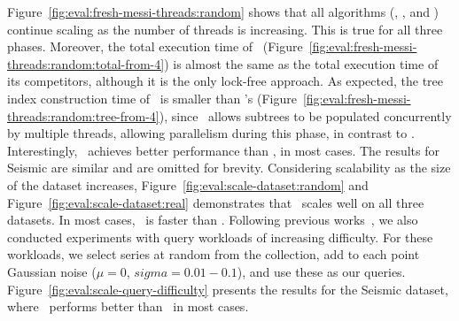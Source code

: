 Figure~\ref{fig:eval:fresh-messi-threads:random} shows that all algorithms
(\Fresh, \MESSI, and \MESSIenh) continue scaling as the number of threads is increasing.
This is true for all three phases. 
Moreover, the total execution time of \Fresh\ 
(Figure~\ref{fig:eval:fresh-messi-threads:random:total-from-4})
is almost the same as the total execution time of its competitors, although it
is the only lock-free approach. 
As expected, the tree index construction time of \Fresh\ is smaller than \MESSI's 
(Figure~\ref{fig:eval:fresh-messi-threads:random:tree-from-4}), since \Fresh\ allows
subtrees to be populated concurrently by multiple threads, allowing parallelism during
this phase, in contrast to \MESSI. 
Interestingly, \Fresh\ achieves better performance than \MESSIenh, in most cases.
The results for Seismic are similar and are omitted for brevity.
Considering scalability as the size of the dataset increases, 
Figure~\ref{fig:eval:scale-dataset:random} and Figure~\ref{fig:eval:scale-dataset:real} 
demonstrates that \Fresh\ scales well on all three datasets. 
In most cases, \Fresh\ is faster than \MESSI.
Following previous works~\cite{DBLP:journals/vldb/ZoumpatianosLIP18,PFP21-I},
we also conducted experiments with query workloads of increasing difficulty.
For these workloads, we select series at random from the collection, add to
each point Gaussian noise ($\mu = 0$, $sigma = 0.01-0.1$), and use these as 
our queries. 
Figure~\ref{fig:eval:scale-query-difficulty} presents the results for
the Seismic dataset, where \Fresh\ performs better than \MESSI\ in most cases.


